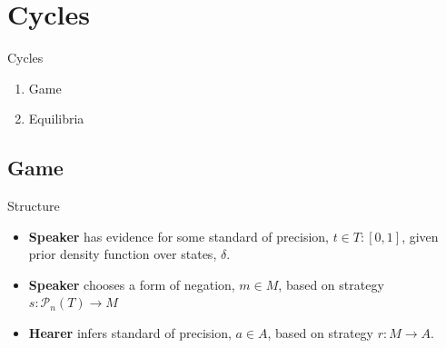 \documentclass[compress]{beamer}
\begin{document}
\section[Cycles]{Cycles}

\begin{frame}{Cycles}
      \begin{enumerate}
           \item Game
	   \item Equilibria
      \end{enumerate}
\end{frame}

\subsection{Game}

\begin{frame}{Structure}
\begin{block}{}
\begin{itemize}
     \item \textbf{Speaker} has evidence for some standard of precision, $t \in T: [0,1]$,  given prior density function over states, $\delta$.
     \item \textbf{Speaker} chooses a form of negation, $m \in M$, based on strategy $s : \mathcal{P}_n(T) \rightarrow M$
     \item \textbf{Hearer} infers standard of precision, $a \in A$, based on strategy $r : M \rightarrow A$.
\end{itemize}
\end{block}
\end{frame}

% 
\end{document}
